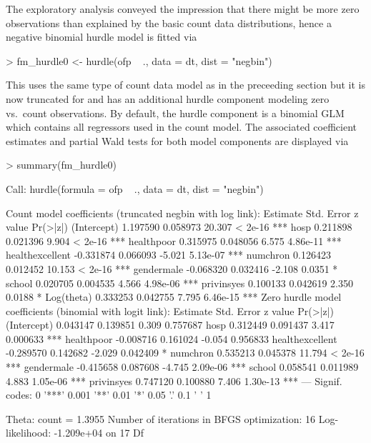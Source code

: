 \documentclass{Z}
\begin{document}
The exploratory analysis conveyed the impression that there might be more zero observations
than explained by the basic count data distributions, hence a negative
binomial hurdle model is fitted via
\begin{Schunk}
\begin{Sinput}
> fm_hurdle0 <- hurdle(ofp ~ ., data = dt, dist = "negbin")
\end{Sinput}
\end{Schunk}
This uses the same type of count data model as in the preceeding section
but it is now truncated for  and has an additional hurdle
component modeling zero vs.\ count observations. By default, the hurdle
component is a binomial GLM which contains all regressors used in the count
model. The associated coefficient estimates and partial Wald tests for
both model components are displayed via
\begin{Schunk}
\begin{Sinput}
> summary(fm_hurdle0)
\end{Sinput}
\begin{Soutput}
Call:
hurdle(formula = ofp ~ ., data = dt, dist = "negbin")


Count model coefficients (truncated negbin with log link):
                 Estimate Std. Error z value Pr(>|z|)    
(Intercept)      1.197590   0.058973  20.307  < 2e-16 ***
hosp             0.211898   0.021396   9.904  < 2e-16 ***
healthpoor       0.315975   0.048056   6.575 4.86e-11 ***
healthexcellent -0.331874   0.066093  -5.021 5.13e-07 ***
numchron         0.126423   0.012452  10.153  < 2e-16 ***
gendermale      -0.068320   0.032416  -2.108   0.0351 *  
school           0.020705   0.004535   4.566 4.98e-06 ***
privinsyes       0.100133   0.042619   2.350   0.0188 *  
Log(theta)       0.333253   0.042755   7.795 6.46e-15 ***
Zero hurdle model coefficients (binomial with logit link):
                 Estimate Std. Error z value Pr(>|z|)    
(Intercept)      0.043147   0.139851   0.309 0.757687    
hosp             0.312449   0.091437   3.417 0.000633 ***
healthpoor      -0.008716   0.161024  -0.054 0.956833    
healthexcellent -0.289570   0.142682  -2.029 0.042409 *  
numchron         0.535213   0.045378  11.794  < 2e-16 ***
gendermale      -0.415658   0.087608  -4.745 2.09e-06 ***
school           0.058541   0.011989   4.883 1.05e-06 ***
privinsyes       0.747120   0.100880   7.406 1.30e-13 ***
---
Signif. codes:  0 '***' 0.001 '**' 0.01 '*' 0.05 '.' 0.1 ' ' 1 

Theta: count = 1.3955
Number of iterations in BFGS optimization: 16 
Log-likelihood: -1.209e+04 on 17 Df
\end{Soutput}
\end{Schunk}
\end{document}
